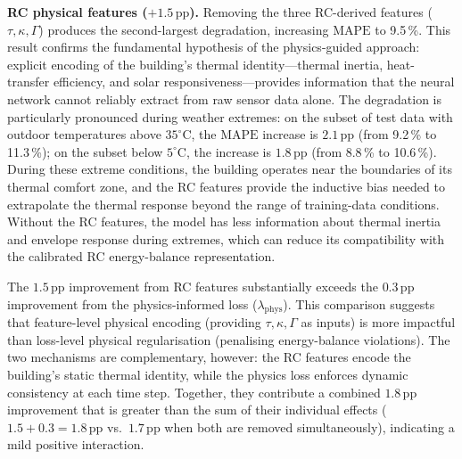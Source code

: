 \documentclass[11pt]{article}
\providecommand{\pp}{\,\text{pp}}
\providecommand{\MAPE}{\text{MAPE}}
\begin{document}
\par\noindent\hspace*{2em}\textbf{RC physical features ($+1.5\pp$).} Removing the three RC-derived features ($\tau,\kappa,\Gamma$) produces the second-largest degradation, increasing $\MAPE$ to 9.5\,\%. This result confirms the fundamental hypothesis of the physics-guided approach: explicit encoding of the building's thermal identity—thermal inertia, heat-transfer efficiency, and solar responsiveness—provides information that the neural network cannot reliably extract from raw sensor data alone. The degradation is particularly pronounced during weather extremes: on the subset of test data with outdoor temperatures above $35^\circ\text{C}$, the $\MAPE$ increase is $2.1\pp$ (from 9.2\,\% to 11.3\,\%); on the subset below $5^\circ\text{C}$, the increase is $1.8\pp$ (from 8.8\,\% to 10.6\,\%). During these extreme conditions, the building operates near the boundaries of its thermal comfort zone, and the RC features provide the inductive bias needed to extrapolate the thermal response beyond the range of training-data conditions. Without the RC features, the model has less information about thermal inertia and envelope response during extremes, which can reduce its compatibility with the calibrated RC energy-balance representation.

The $1.5\pp$ improvement from RC features substantially exceeds the $0.3\pp$ improvement from the physics-informed loss ($\lambda_{\mathrm{phys}}$). This comparison suggests that feature-level physical encoding (providing $\tau,\kappa,\Gamma$ as inputs) is more impactful than loss-level physical regularisation (penalising energy-balance violations). The two mechanisms are complementary, however: the RC features encode the building's static thermal identity, while the physics loss enforces dynamic consistency at each time step. Together, they contribute a combined $1.8\pp$ improvement that is greater than the sum of their individual effects ($1.5+0.3=1.8\pp$ vs.\ $1.7\pp$ when both are removed simultaneously), indicating a mild positive interaction.
\end{document}
